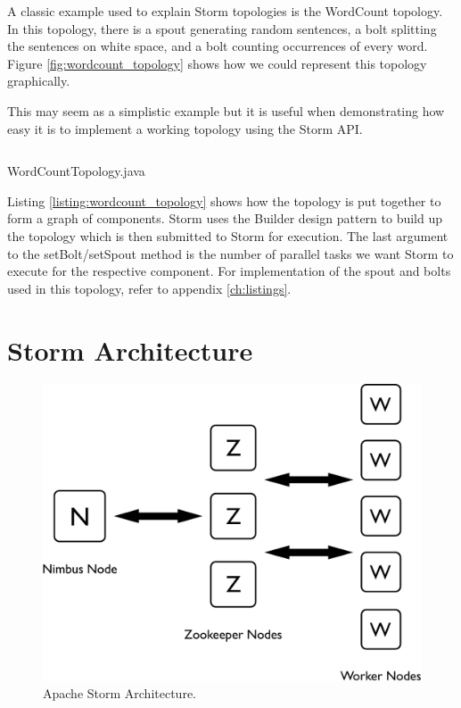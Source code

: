 \documentclass[bsc,logo,frontabs,twoside,singlespacing,normalheadings,parskip]{infthesis}\usepackage[]{graphicx}\usepackage[]{color}
\begin{document}
A classic example used to explain Storm topologies is the WordCount topology. In this topology, there is a spout generating random sentences, a bolt splitting the sentences on white space, and a bolt counting occurrences of every word. Figure \ref{fig:wordcount_topology} shows how we could represent this topology graphically.

This may seem as a simplistic example but it is useful when demonstrating how easy it is to implement a working topology using the Storm API.

\begin{listing}[!htb]
\inputminted{java}{code/WordCountTopology.java}
\caption{WordCountTopology.java}
\label{listing:wordcount_topology}
\end{listing}

Listing \ref{listing:wordcount_topology} shows how the topology is put together to form a graph of components. Storm uses the Builder design pattern to build up the topology which is then submitted to Storm for execution. The last argument to the setBolt/setSpout method is the number of parallel tasks we want Storm to execute for the respective component. For implementation of the spout and bolts used in this topology, refer to appendix \ref{ch:listings}.

\section{Storm Architecture}
\label{sec:storm_arch}

\begin{figure}[!htb]
	\centering
	\includegraphics[scale=0.5]{pdf/storm_arch.pdf}
	\caption{Apache Storm Architecture.}
	\label{fig:storm_arch}
\end{figure}
\end{document}

